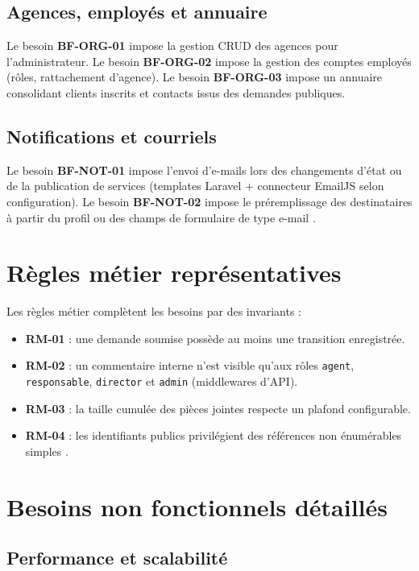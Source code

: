 \subsection{Agences, employés et annuaire}

Le besoin \textbf{BF-ORG-01} impose la gestion CRUD des agences pour l'administrateur. Le besoin \textbf{BF-ORG-02} impose la gestion des comptes employés (rôles, rattachement d'agence). Le besoin \textbf{BF-ORG-03} impose un annuaire consolidant clients inscrits et contacts issus des demandes publiques.

\subsection{Notifications et courriels}

Le besoin \textbf{BF-NOT-01} impose l'envoi d'e-mails lors des changements d'état ou de la publication de services (templates Laravel + connecteur EmailJS selon configuration). Le besoin \textbf{BF-NOT-02} impose le préremplissage des destinataires à partir du profil ou des champs de formulaire de type e-mail \cite{pressman2014}.

\section{Règles métier représentatives}

Les règles métier complètent les besoins par des invariants :

\begin{itemize}[leftmargin=*]
  \item \textbf{RM-01} : une demande soumise possède au moins une transition enregistrée.
  \item \textbf{RM-02} : un commentaire interne n'est visible qu'aux rôles \texttt{agent}, \texttt{responsable}, \texttt{director} et \texttt{admin} (middlewares d'API).
  \item \textbf{RM-03} : la taille cumulée des pièces jointes respecte un plafond configurable.
  \item \textbf{RM-04} : les identifiants publics privilégient des références non énumérables simples \cite{owasp2021}.
\end{itemize}

\section{Besoins non fonctionnels détaillés}

\subsection{Performance et scalabilité}

